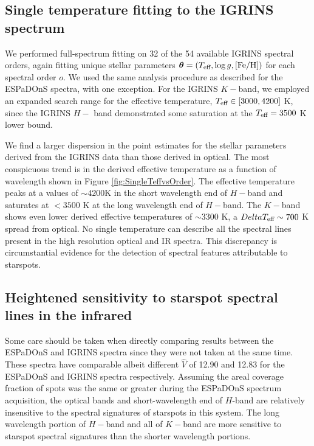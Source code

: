 \documentclass[twocolumn]{emulateapj}%
\begin{document}
\subsection{Single temperature fitting to the IGRINS spectrum}\label{sec:IGR_starfish}

We performed full-spectrum fitting on 32 of the 54 available IGRINS spectral orders, again fitting unique stellar parameters ${\bm \theta} = (T_\textrm{eff}, \log g, [{\rm Fe}/{\rm H}])$ for each spectral order $o$.  We used the same analysis procedure as described for the ESPaDOnS spectra, with one exception.  For the IGRINS $K-$band, we employed an expanded search range for the effective temperature, $T_\textrm{eff} \in [3000, 4200]$ K, since the IGRINS $H-$ band demonstrated some saturation at the $T_\textrm{eff}=3500$ K lower bound.  

We find a larger dispersion in the point estimates for the stellar parameters derived from the IGRINS data than those derived in optical.  The most conspicuous trend is in the derived effective temperature as a function of wavelength shown in Figure \ref{fig:SingleTeffvsOrder}.  The effective temperature peaks at a values of $\sim4200$K in the short wavelength end of $H-$band and saturates at $<3500$ K at the long wavelength end of $H-$band.  The $K-$band shows even lower derived effective temperatures of $\sim3300$ K, a $Delta T_\textrm{eff} \sim 700$ K spread from optical.  No single temperature can describe all the spectral lines present in the high resolution optical and IR spectra.  This discrepancy is circumstantial evidence for the detection of spectral features attributable to starspots.  


\subsection{Heightened sensitivity to starspot spectral lines in the infrared}\label{sec:whyNearIR}

Some care should be taken when directly comparing results between the ESPaDOnS and IGRINS spectra since they were not taken at the same time.  These spectra have comparable albeit different $\hat V$ of 12.90 and 12.83 for the ESPaDOnS and IGRINS spectra respectively.  Assuming the areal coverage fraction of spots was the same or greater during the ESPaDOnS spectrum acquisition, the optical bands and short-wavelength end of $H$-band are relatively insensitive to the spectral signatures of starspots in this system.  The long wavelength portion of $H-$band and all of $K-$band are more sensitive to starspot spectral signatures than the shorter wavelength portions.
\end{document}
